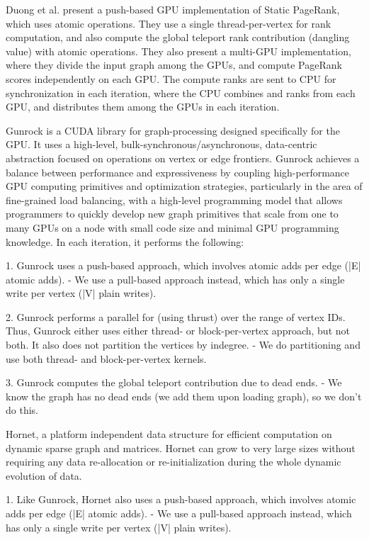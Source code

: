 Duong et al. \cite{rank-duong12} present a push-based GPU implementation of Static PageRank, which uses atomic operations. They use a single thread-per-vertex for rank computation, and also compute the global teleport rank contribution (dangling value) with atomic operations. They also present a multi-GPU implementation, where they divide the input graph among the GPUs, and compute PageRank scores independently on each GPU. The compute ranks are sent to CPU for synchronization in each iteration, where the CPU combines and ranks from each GPU, and distributes them among the GPUs in each iteration.


Gunrock is a CUDA library for graph-processing designed specifically for the GPU. It uses a high-level, bulk-synchronous/asynchronous, data-centric abstraction focused on operations on vertex or edge frontiers. Gunrock achieves a balance between performance and expressiveness by coupling high-performance GPU computing primitives and optimization strategies, particularly in the area of fine-grained load balancing, with a high-level programming model that allows programmers to quickly develop new graph primitives that scale from one to many GPUs on a node with small code size and minimal GPU programming knowledge.
In each iteration, it performs the following:

1. Gunrock uses a push-based approach, which involves atomic adds per edge (|E| atomic adds).
- We use a pull-based approach instead, which has only a single write per vertex (|V| plain writes).

2. Gunrock performs a parallel for (using thrust) over the range of vertex IDs.
Thus, Gunrock either uses either thread- or block-per-vertex approach, but not both.
It also does not partition the vertices by indegree.
- We do partitioning and use both thread- and block-per-vertex kernels.

3. Gunrock computes the global teleport contribution due to dead ends.
- We know the graph has no dead ends (we add them upon loading graph), so we don't do this.


Hornet, a platform independent data structure for efficient computation on dynamic sparse graph and matrices. Hornet can grow to very large sizes without requiring any data re-allocation or re-initialization during the whole dynamic evolution of data.

1. Like Gunrock, Hornet also uses a push-based approach, which involves atomic adds per edge (|E| atomic adds).
- We use a pull-based approach instead, which has only a single write per vertex (|V| plain writes).

